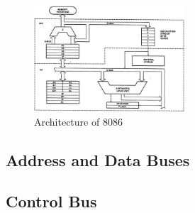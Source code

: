     \begin{figure}[h]
        \begin{center}
            \includegraphics[width=0.5\textwidth]{figures/02_8086_architecture.jpg}
            \caption{Architecture of 8086} \label{fig:8086_architecture}
        \end{center}
    \end{figure}

    \subsection{Address and Data Buses}    

    \subsection{Control Bus}

